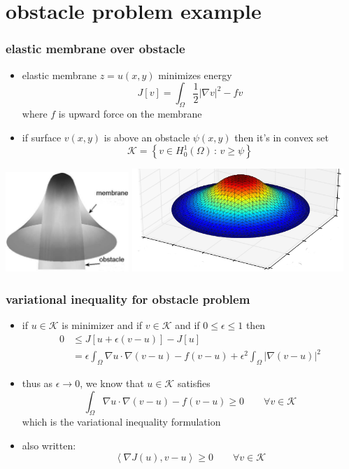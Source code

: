 \documentclass{beamer}
\newcommand{\eps}{\epsilon}
\newcommand{\grad}{\nabla}
\begin{document}
\section[obstacle]{obstacle problem example}

\begin{frame}
  \frametitle{elastic membrane over obstacle}

\begin{itemize}
\item elastic membrane $z = u(x,y)$ minimizes energy
$$J[v] = \int_\Omega \frac{1}{2} |\grad v|^2 - f v$$
where $f$ is upward force on the membrane
\item if surface $v(x,y)$ is above an obstacle $\psi(x,y)$ then it's in convex set
$$\mathcal{K} = \left\{v \in H_0^1(\Omega) \,:\, v \ge \psi\right\}$$
\end{itemize}

\begin{center}
\includegraphics[width=0.35\textwidth]{figs/classicalobs} \quad \includegraphics[width=0.6\textwidth]{figs/obs-soln}
\end{center}
\end{frame}


\begin{frame}
  \frametitle{variational inequality for obstacle problem}

\begin{itemize}
\item if $u\in \mathcal{K}$ is minimizer and if $v\in\mathcal{K}$ and if $0\le \eps \le 1$ then
   \begin{align*}
   0 &\le J[u + \eps(v-u)] - J[u] \\
     &= \eps \int_\Omega \grad u \cdot \grad(v-u) - f (v-u) + \eps^2 \int_\Omega |\grad(v-u)|^2
   \end{align*}
\item thus as $\eps \to 0$, we know that $u\in\mathcal{K}$ satisfies
  $$\int_\Omega \grad u \cdot \grad(v-u) - f (v-u) \ge 0 \qquad \forall v\in\mathcal{K}$$
which is the variational inequality formulation
\item also written:
  $$\left<\grad J(u), v-u\right> \ge 0 \qquad \forall v\in\mathcal{K}$$
\end{itemize}
\end{frame}
\end{document}
